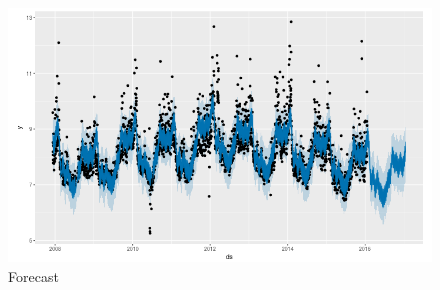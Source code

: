 \begin{figure}[h]
\label{bd}
\centering
\includegraphics[width= 15 cm]{proph.png}
\caption{Forecast}
\end{figure}


